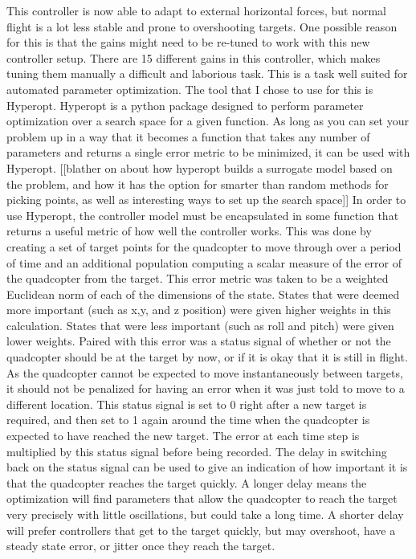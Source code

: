 \documentclass[letterpaper,12pt,titlepage,oneside,final]{book}
\begin{document}
This controller is now able to adapt to external horizontal forces, but normal flight is a lot less stable and prone to overshooting targets. One possible reason for this is that the gains might need to be re-tuned to work with this new controller setup. There are 15 different gains in this controller, which makes tuning them manually a difficult and laborious task.
This is a task well suited for automated parameter optimization. The tool that I chose to use for this is Hyperopt. Hyperopt is a python package designed to perform parameter optimization over a search space for a given function. As long as you can set your problem up in a way that it becomes a function that takes any number of parameters and returns a single error metric to be minimized, it can be used with Hyperopt. [[blather on about how hyperopt builds a surrogate model based on the problem, and how it has the option for smarter than random methods for picking points, as well as interesting ways to set up the search space]]
In order to use Hyperopt, the controller model must be encapsulated in some function that returns a useful metric of how well the controller works. This was done by creating a set of target points for the quadcopter to move through over a period of time and an additional population computing a scalar measure of the error of the quadcopter from the target. This error metric was taken to be a weighted Euclidean norm of each of the dimensions of the state. States that were deemed more important (such as x,y, and z position) were given higher weights in this calculation. States that were less important (such as roll and pitch) were given lower weights. Paired with this error was a status signal of whether or not the quadcopter should be at the target by now, or if it is okay that it is still in flight. As the quadcopter cannot be expected to move instantaneously between targets, it should not be penalized for having an error when it was just told to move to a different location. This status signal is set to 0 right after a new target is required, and then set to 1 again around the time when the quadcopter is expected to have reached the new target. The error at each time step is multiplied by this status signal before being recorded. The delay in switching back on the status signal can be used to give an indication of how important it is that the quadcopter reaches the target quickly. A longer delay means the optimization will find parameters that allow the quadcopter to reach the target very precisely with little oscillations, but could take a long time. A shorter delay will prefer controllers that get to the target quickly, but may overshoot, have a steady state error, or jitter once they reach the target.
\end{document}
